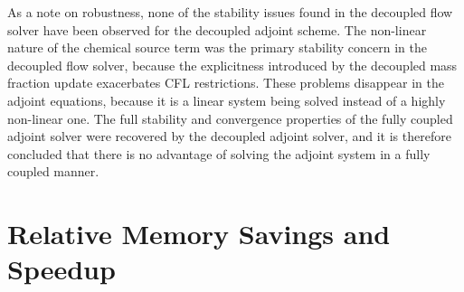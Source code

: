 As a note on robustness, none of the stability issues found in the decoupled
flow solver have been observed for the decoupled adjoint scheme.  The
non-linear nature of the chemical source term was the primary stability concern
in the decoupled flow solver, because the explicitness introduced by the decoupled
mass fraction update exacerbates CFL restrictions.  These problems disappear in
the adjoint equations, because it is a linear system being solved instead of a
highly non-linear one.  The full stability and convergence properties of the
fully coupled adjoint solver were recovered by the decoupled adjoint solver, and
it is therefore concluded that there is no advantage of solving the adjoint
system in a fully coupled manner.

\section{Relative Memory Savings and Speedup}
\label{sec:adj-cost-mem-savings}

